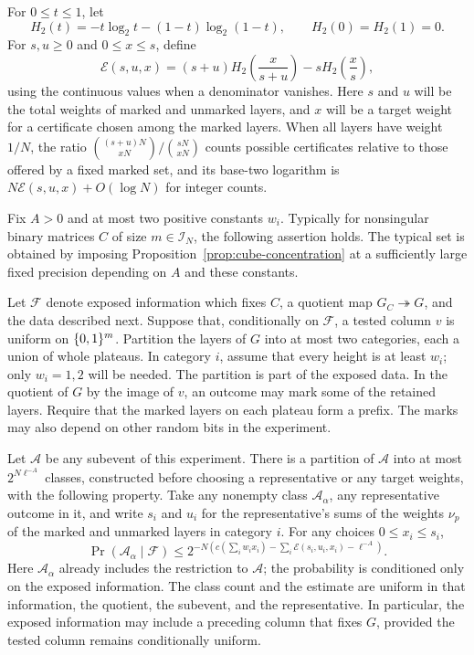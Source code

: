 For \(0\le t\le1\), let
\[
 H_2(t)=-t\log_2t-(1-t)\log_2(1-t),
 \qquad H_2(0)=H_2(1)=0.
\]
For \(s,u\ge0\) and \(0\le x\le s\), define
\begin{equation}\label{eq:entropy-cost}
 \mathcal E(s,u,x)
 =(s+u)H_2\!\left(\frac{x}{s+u}\right)
       -sH_2\!\left(\frac{x}{s}\right),
\end{equation}
using the continuous values when a denominator vanishes. Here \(s\) and
\(u\) will be the total weights of marked and unmarked layers, and \(x\)
will be a target weight for a certificate chosen among the marked layers.
When all layers have weight \(1/N\), the ratio
\(\binom{(s+u)N}{xN}/\binom{sN}{xN}\) counts possible certificates
relative to those offered by a fixed marked set, and its base-two logarithm
is \(N\mathcal E(s,u,x)+O(\log N)\) for integer counts.

\begin{proposition}\label{prop:certificate-pricing}
Fix \(A>0\) and at most two positive constants \(w_i\). Typically for
nonsingular binary matrices \(C\) of size
\(m\in\mathcal I_N\), the following assertion holds. The typical set
is obtained by imposing Proposition~\ref{prop:cube-concentration} at a
sufficiently large fixed precision depending on \(A\) and these constants.

Let \(\mathcal F\) denote exposed information which fixes \(C\), a
quotient map \(G_C\twoheadrightarrow G\), and the data described next.
Suppose that, conditionally on \(\mathcal F\), a tested column \(v\) is
uniform on \(\{0,1\}^m\). Partition the layers of \(G\) into at most two
categories, each a union of whole plateaus. In category \(i\), assume
that every height is at least \(w_i\); only \(w_i=1,2\) will be needed.
The partition is part of the exposed data. In the quotient of \(G\) by the image of \(v\),
an outcome may mark some of the retained layers. Require that the marked
layers on each plateau form a prefix. The marks may also depend on other
random bits in the experiment.

Let \(\mathcal A\) be any subevent of this experiment. There is a
partition of \(\mathcal A\) into at most \(2^{N\ell^{-A}}\) classes,
constructed before choosing a representative or any target weights, with
the following property. Take any nonempty class \(\mathcal A_\alpha\),
any representative outcome in it, and write \(s_i\) and \(u_i\) for
the representative's sums of the weights \(\nu_p\) of the marked and
unmarked layers in category \(i\). For any choices \(0\le x_i\le s_i\),
\begin{equation}\label{eq:certificate-pricing}
 \Pr(\mathcal A_\alpha\mid\mathcal F)
 \le 2^{-N\left(
 c\left(\sum_i w_i x_i\right)
       -\sum_i\mathcal E(s_i,u_i,x_i)-\ell^{-A}\right)}.
\end{equation}
Here \(\mathcal A_\alpha\) already includes the restriction to
\(\mathcal A\); the probability is conditioned only on the exposed
information. The class count and the estimate are uniform in that
information, the quotient, the subevent, and the representative. In
particular, the exposed information may include a preceding column that
fixes \(G\), provided the tested column remains conditionally uniform.
\end{proposition}


